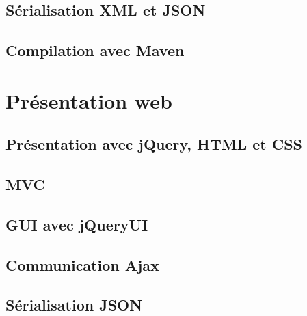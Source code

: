\documentclass{article}
\begin{document}
\subsection{Sérialisation XML et JSON} %
\label{sub:serialisation_xml_et_json}

\subsection{Compilation avec Maven} %
\label{sub:coordonateur_de_services_compilation_avec_maven}


\section{Présentation web} %
\label{sec:presentation_web}

\subsection{Présentation avec jQuery, HTML et CSS} %
\label{sub:presentation_avec_jquery_html_et_css}

\subsection{MVC} %
\label{sub:mvc}

\subsection{GUI avec jQueryUI} %
\label{sub:gui_avec_jqueryui}

\subsection{Communication Ajax} %
\label{sub:communication_ajax}

\subsection{Sérialisation JSON} %
\label{sub:serialisation_json}

\end{document}
